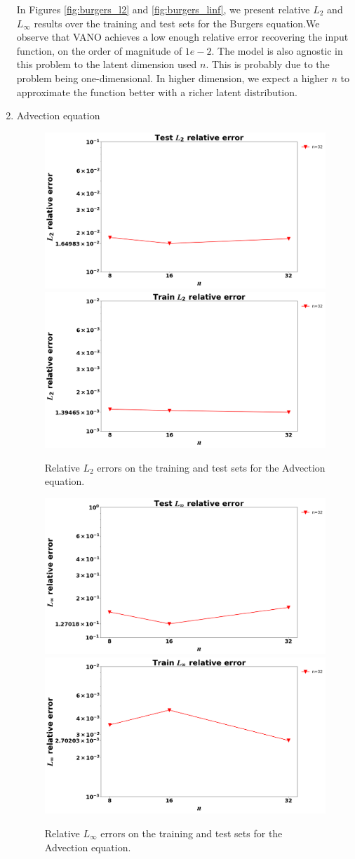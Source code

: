 \documentclass[11pt, fullpage,letterpaper]{article}
\begin{document}
\begin{enumerate}
In Figures \ref{fig:burgers_l2} and \ref{fig:burgers_linf}, we present relative $L_2$ and $L_\infty$ results over the training and test sets for the Burgers equation.We observe that VANO achieves a low enough relative error recovering the input function, on the order of magnitude of $1e-2$. The model is also agnostic in this problem to the latent dimension used $n$. This is probably due to the problem being one-dimensional. In higher dimension, we expect a higher $n$ to approximate the function better with a richer latent distribution.

\item Advection equation

\begin{figure}[h]
    \centering
    \includegraphics[width=0.5\linewidth]{all_plots/Advection/test_l2_vs_size.png} 
    \includegraphics[width=0.5\linewidth]{all_plots/Advection/train_l2_vs_size.png} 
    \caption{Relative $L_2$ errors on the training and test sets for the Advection equation.}
    \label{fig:advection_l2}
\end{figure}

\begin{figure}[h]
    \centering
    \includegraphics[width=0.5\linewidth]{all_plots/Advection/test_linf_vs_size.png} 
    \includegraphics[width=0.5\linewidth]{all_plots/Advection/train_linf_vs_size.png} 
    \caption{Relative $L_\infty$ errors on the training and test sets for the Advection equation.}
    \label{fig:advection_linf}
\end{figure}


\end{enumerate}
\end{document}
